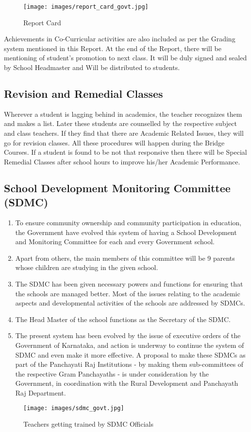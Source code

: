 \begin{figure}[H]
    \centering
    \texttt{[image: images/report\_card\_govt.jpg]}
    \caption{Report Card}
\end{figure}

Achievements in Co-Curricular activities are also included as per the Grading system mentioned in this Report. At the end of the Report, there will be mentioning of student's promotion to next class. It will be duly signed and sealed by School Headmaster and Will be distributed to students.

\subsection{Revision and Remedial Classes}
Wherever a student is lagging behind in academics, the teacher recognizes them and makes a list. Later these students are counselled by the respective subject and class teachers. If they find that there are Academic Related Issues, they will go for revision classes. All these procedures will happen during the Bridge Courses. If a student is found to be not that responsive then there will be Special Remedial Classes after school hours to improve his/her Academic Performance. 

\subsection{School Development Monitoring Committee (SDMC)}
\begin{enumerate}
\item To ensure community ownership and community participation in education, the Government have evolved this system of having a School Development and Monitoring 
Committee for each and every Government school. 
\item Apart from others, the main members of this committee will be 9 parents whose children are studying in the given school. 
\item The SDMC has been given necessary powers and functions for ensuring that the schools are managed better. Most of the issues relating to the academic aspects and developmental activities of the schools are addressed by SDMCs. 
\item The Head Master of the school functions as the Secretary of the SDMC.
\item The present system has been evolved by the issue of executive orders of the Government of Karnataka, and action is underway to continue the system of SDMC and even make it more effective. A proposal to make these SDMCs as part of the Panchayati Raj Institutions - by making them sub-committees of the respective Gram Panchayaths - is under consideration by the Government, in coordination with the Rural Development and Panchayath Raj Department.
\end{enumerate}
\begin{figure}
    \centering
    \texttt{[image: images/sdmc\_govt.jpg]}
    \caption{Teachers getting trained by SDMC Officials}
\end{figure}

